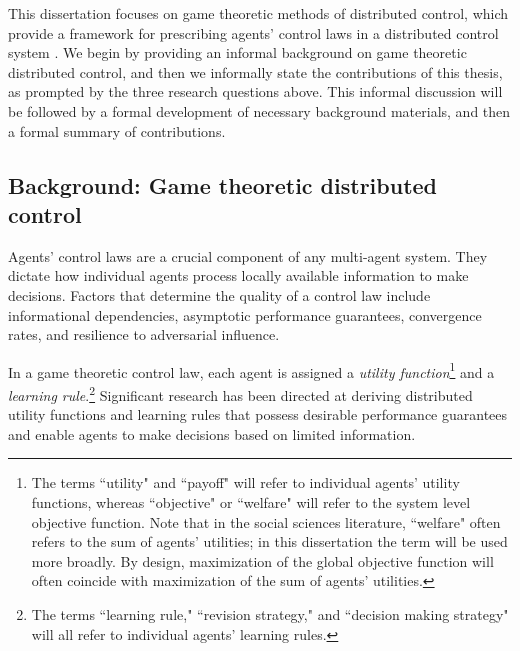 This dissertation focuses on game theoretic methods of distributed control, which provide a framework for prescribing agents' control laws in a distributed control system \cite{Marden2008, Zhu2009, Goto2010, Staudigl2012, Fox2010, Lasaulce2011, Alpcan2010, Han2012, MacKenzie2006, Menache2011}. We begin by providing an informal background on game theoretic distributed control, and then we informally state the contributions of this thesis, as prompted by the three research questions above. This informal discussion will be followed by a formal development of necessary background materials, and then a formal summary of  contributions. 


\subsection{Background: Game theoretic distributed control}

Agents' control laws are a crucial component of any multi-agent system. They dictate how individual agents process locally available information to make decisions. Factors that determine the quality of a control law include informational dependencies, asymptotic performance guarantees, convergence rates, and resilience to adversarial influence.

In a game theoretic control law, each agent is assigned a {\it utility function}\footnote{The terms ``utility" and ``payoff" will refer to individual agents' utility functions, whereas ``objective" or ``welfare" will refer to the system level objective function. Note that in the social sciences literature, ``welfare" often refers to the sum of agents' utilities; in this dissertation the term will be used more broadly. By design, maximization of the global objective function will often coincide with maximization of the sum of agents' utilities. } and a {\it learning rule}.\footnote{The terms ``learning rule," ``revision strategy," and ``decision making strategy" will all refer to individual agents' learning rules.} Significant research has been directed at deriving distributed utility functions and learning rules that possess desirable performance guarantees and enable agents to make decisions based on limited information.


